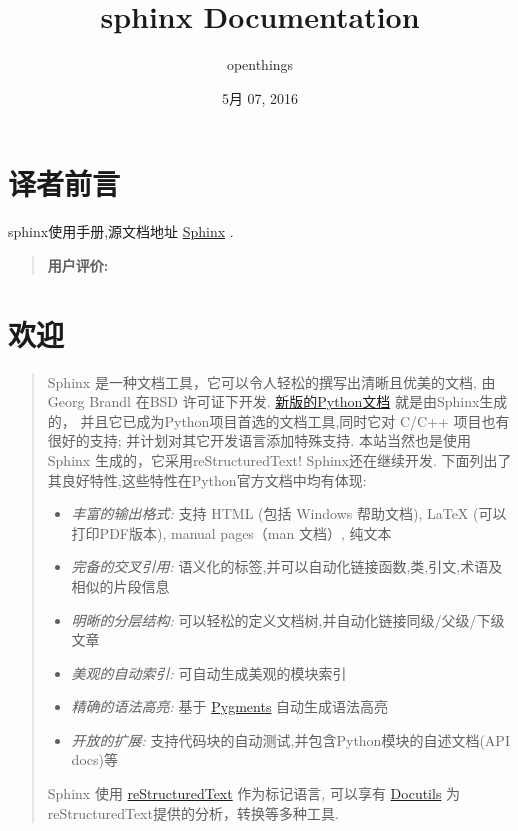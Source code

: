 \documentclass[letterpaper,10pt,english]{sphinxmanual}
\title{sphinx Documentation}
\date{5月 07, 2016}
\author{openthings}
\begin{document}
\maketitle
\tableofcontents
{}\label{contents::doc}



\chapter{译者前言}
\label{index::doc}\label{index:contents}\label{index:sphinx}\label{index:id1}
sphinx使用手册,源文档地址 \href{http://sphinx.pocoo.org/}{Sphinx} .
\begin{quote}

\textbf{用户评价:}
\end{quote}


\chapter{欢迎}
\label{index:id2}\begin{quote}

Sphinx 是一种文档工具，它可以令人轻松的撰写出清晰且优美的文档, 由 Georg Brandl 在BSD 许可证下开发.
\href{http://docs.python.org/}{新版的Python文档} 就是由Sphinx生成的，
并且它已成为Python项目首选的文档工具,同时它对 C/C++ 项目也有很好的支持; 并计划对其它开发语言添加特殊支持.
本站当然也是使用 Sphinx 生成的，它采用reStructuredText!
Sphinx还在继续开发. 下面列出了其良好特性,这些特性在Python官方文档中均有体现:
\begin{itemize}
\item {} 
\emph{丰富的输出格式:} 支持 HTML (包括 Windows 帮助文档), LaTeX (可以打印PDF版本), manual pages（man 文档）, 纯文本

\item {} 
\emph{完备的交叉引用:} 语义化的标签,并可以自动化链接函数,类,引文,术语及相似的片段信息

\item {} 
\emph{明晰的分层结构:} 可以轻松的定义文档树,并自动化链接同级/父级/下级文章

\item {} 
\emph{美观的自动索引:} 可自动生成美观的模块索引

\item {} 
\emph{精确的语法高亮:} 基于 \href{http://pygments.org/}{Pygments} 自动生成语法高亮

\item {} 
\emph{开放的扩展:} 支持代码块的自动测试,并包含Python模块的自述文档(API docs)等

\end{itemize}

Sphinx 使用 \href{http://docutils.sf.net/rst.html}{reStructuredText}
作为标记语言, 可以享有 \href{http://docutils.sf.net/}{Docutils} 为reStructuredText提供的分析，转换等多种工具.
\end{quote}
\end{document}
